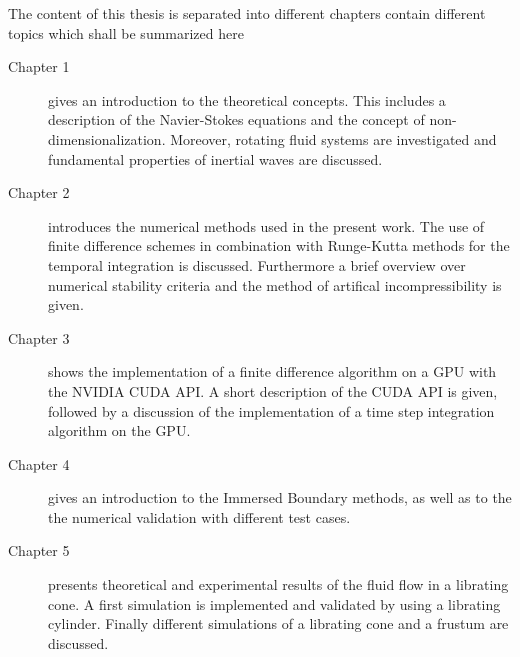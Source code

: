 The content of this thesis is separated into different chapters contain different topics which shall be summarized here

\begin{description}
\item[Chapter 1] gives an introduction to the theoretical concepts. This includes a description of the Navier-Stokes equations and
                 the concept of non-dimensionalization. Moreover, rotating fluid systems are investigated and
                 fundamental properties of inertial waves are discussed.

\item[Chapter 2] introduces the numerical methods used in the present work.
                 The use of finite difference schemes in combination with Runge-Kutta methods for the temporal integration is discussed.
                 Furthermore a brief overview over numerical stability criteria and the method of artifical incompressibility is given.

\item[Chapter 3] shows the implementation of a finite difference algorithm on a GPU with the NVIDIA CUDA API.
                 A short description of the CUDA API is given, followed by a discussion of the implementation of
                 a time step integration algorithm on the GPU.

\item[Chapter 4] gives an introduction to the Immersed Boundary methods, as well as to the
                 the numerical validation with different test cases.

\item[Chapter 5] presents theoretical and experimental results of the fluid flow in a librating cone.
                 A first simulation is implemented and validated by using a librating cylinder.
                 Finally different  simulations of a librating cone and a frustum are discussed.

\end{description}

%












